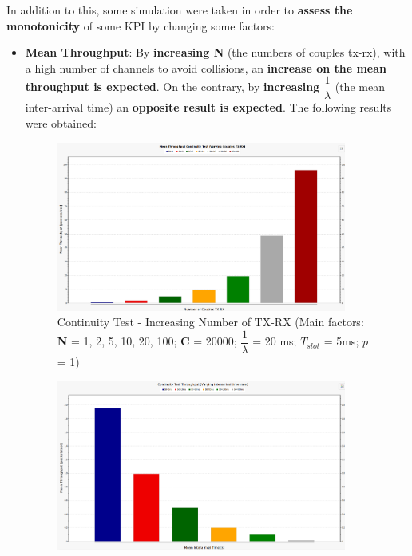 \vspace{5mm}
\noindent In addition to this, some simulation were taken in order to \textbf{assess the monotonicity} of some KPI by changing some factors:
\begin{itemize}
	\item \textbf{Mean Throughput}: By \textbf{increasing N} (the numbers of couples tx-rx), with a high number of channels to avoid collisions, an \textbf{increase on the mean throughput is expected}. On the contrary, by \textbf{increasing} $\dfrac{1}{\lambda}$ (the mean inter-arrival time) an \textbf{opposite result is expected}. The following results were obtained:
	\begin{figure}[H]
		\centering
		\includegraphics[width=0.9\textwidth]{img/continuityTest_Throughput_TXRX_Varying.png}
		\caption{Continuity Test - Increasing Number of TX-RX (Main factors: \textbf{N} = 1, 2, 5, 10, 20, 100; \textbf{C} = 20000; $\dfrac{1}{\lambda}$ = 20 ms; $T_{slot}$ = 5ms; $p$ = 1)}
		\label {img: continuityTestThTXRX}
	\end{figure}
	\begin{figure}[H]
		\centering
		\includegraphics[width=0.9\textwidth]{img/continuityTest_Throughput_IntTimeVarying.png}

\end{figure}
\end{itemize}
